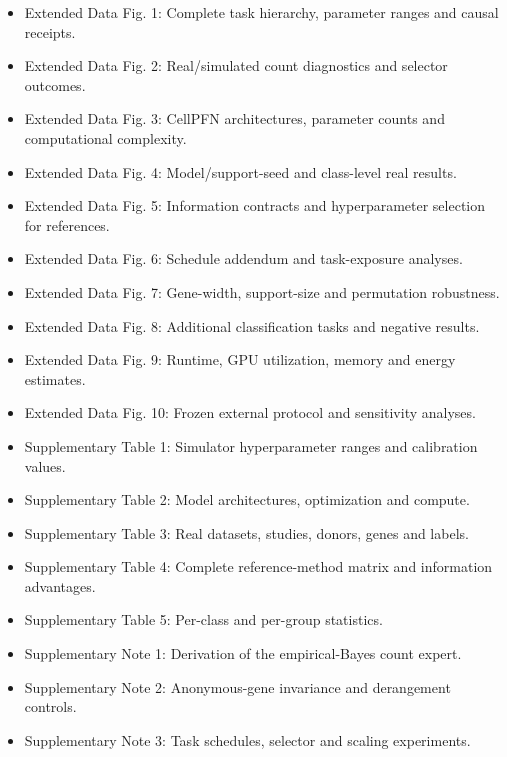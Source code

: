\documentclass[12pt]{article}
\begin{document}
\begin{itemize}
\item Extended Data Fig. 1: Complete task hierarchy, parameter ranges and causal receipts.
\item Extended Data Fig. 2: Real/simulated count diagnostics and selector outcomes.
\item Extended Data Fig. 3: CellPFN architectures, parameter counts and computational complexity.
\item Extended Data Fig. 4: Model/support-seed and class-level real results.
\item Extended Data Fig. 5: Information contracts and hyperparameter selection for references.
\item Extended Data Fig. 6: Schedule addendum and task-exposure analyses.
\item Extended Data Fig. 7: Gene-width, support-size and permutation robustness.
\item Extended Data Fig. 8: Additional classification tasks and negative results.
\item Extended Data Fig. 9: Runtime, GPU utilization, memory and energy estimates.
\item Extended Data Fig. 10: Frozen external protocol and sensitivity analyses.
\item Supplementary Table 1: Simulator hyperparameter ranges and calibration values.
\item Supplementary Table 2: Model architectures, optimization and compute.
\item Supplementary Table 3: Real datasets, studies, donors, genes and labels.
\item Supplementary Table 4: Complete reference-method matrix and information advantages.
\item Supplementary Table 5: Per-class and per-group statistics.
\item Supplementary Note 1: Derivation of the empirical-Bayes count expert.
\item Supplementary Note 2: Anonymous-gene invariance and derangement controls.
\item Supplementary Note 3: Task schedules, selector and scaling experiments.
\end{itemize}
\end{document}

